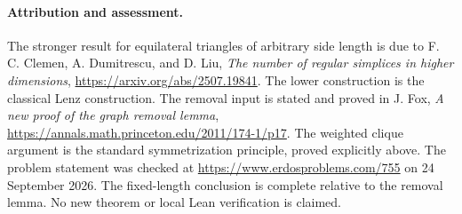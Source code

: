 \paragraph{Attribution and assessment.}
The stronger result for equilateral triangles of arbitrary side length is due to F. C. Clemen, A. Dumitrescu, and D. Liu, \emph{The number of regular simplices in higher dimensions}, \url{https://arxiv.org/abs/2507.19841}. The lower construction is the classical Lenz construction. The removal input is stated and proved in J. Fox, \emph{A new proof of the graph removal lemma}, \url{https://annals.math.princeton.edu/2011/174-1/p17}. The weighted clique argument is the standard symmetrization principle, proved explicitly above. The problem statement was checked at \url{https://www.erdosproblems.com/755} on 24 September 2026. The fixed-length conclusion is complete relative to the removal lemma. No new theorem or local Lean verification is claimed.
